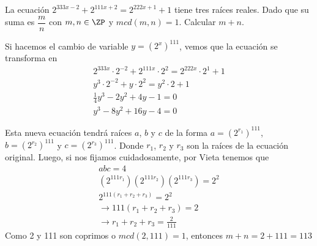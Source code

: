 \begin{section-problem}
    La ecuación $2^{333x - 2} + 2^{111x + 2} = 2^{222x + 1} + 1$ tiene tres raíces reales.
    Dado que su suma es $\dfrac{m}{n}$ con $m, n \in \ZP$ y $mcd(m, n) = 1$.
    Calcular $m + n$.

    \begin{solution}
        Si hacemos el cambio de variable $y = (2^x)^{111}$, vemos que la ecuación se transforma en
        \begin{gather*}
            2^{333x} \cdot 2^{-2} + 2^{111x} \cdot 2^2 = 2^{222x}\cdot 2^1 + 1\\
            y^3\cdot 2^{-2} + y \cdot 2^2 = y^2\cdot 2 + 1\\
            \frac{1}{4} y^3 - 2 y^2 + 4y - 1 = 0\\
            y^3 - 8 y^2 + 16y - 4 = 0
        \end{gather*}

        Esta nueva ecuación tendrá raíces $a$, $b$ y $c$ de la forma $a = (2^{r_1})^{111}$, $b = (2^{r_2})^{111}$ y $c = (2^{r_3})^{111}$.
        Donde $r_1$, $r_2$ y $r_3$ son la raíces de la ecuación original.
        Luego, si nos fijamos cuidadosamente, por Vieta tenemos que
        \begin{gather*}
            abc = 4\\
            (2^{111 r_1})(2^{111 r_2})(2^{111 r_3}) = 2^2\\
            2^{111(r_1 + r_2 + r_3)} = 2^2\\
            \rightarrow 111(r_1 + r_2 + r_3) = 2\\
            \rightarrow r_1 + r_2 + r_3 = \frac{2}{111}
        \end{gather*}
        Como 2 y 111 son coprimos o $mcd(2, 111) = 1$, entonces $m + n = 2 + 111 = \boxed{113}$
    \end{solution}
\end{section-problem}

